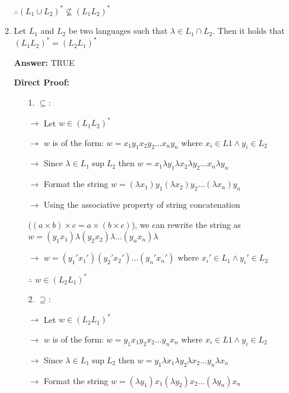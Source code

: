 \documentclass[12pt]{article}
\begin{document}
\begin{spacing}{1.5}
\begin{enumerate}
\begin{enumerate}
			            $\therefore (L_1 \cup L_2)^* \not\subseteq (L_1L_2)^*$

			            \newpage

			      \item Let $L_1$ and $L_2$ be two languages such that $\lambda \in L_1 \cap L_2$. Then it holds that $(L_1L_2)^* = (L_2L_1)^*$

			            \noindent \textbf{Answer:} TRUE

			            \noindent \textbf{Direct Proof:}

			            \begin{enumerate}
				            \item[1.] $\subseteq$:

				                  $\rightarrow$ Let $w \in (L_1L_2)^*$

				                  $\rightarrow$ $w$ is of the form: $w = x_1y_1x_2y_2 \dots x_ny_n$ where $x_i \in L1 \land y_i \in L_2$

				                  $\rightarrow$ Since $\lambda \in L_1 \sup L_2$ then $w = x_1 \lambda y_1 \lambda x_2 \lambda y_2 \dots x_n \lambda y_n$

				                  $\rightarrow$ Format the string $w = (\lambda x_1)y_1(\lambda x_2)y_2 \dots (\lambda x_n)y_n$

				                  $\rightarrow$ Using the associative property of string
				                  concatenation

				                  ($(a\times b) \times c = a \times (b \times c)$), we can rewrite the string as $w = (y_1x_1)\lambda(y_2x_2)\lambda \dots (y_nx_n)\lambda$

				                  $\rightarrow$ $w = (y_1'x_1')(y_2'x_2') \dots (y_n'x_n')$ where $x_i' \in L_1 \land y_i' \in L_2$

				                  $\therefore$ $w \in (L_2L_1)^*$

				            \item[2.] $\supseteq$:

				                  $\rightarrow$ Let $w \in (L_2L_1)^*$

				                  $\rightarrow$ $w$ is of the form: $w = y_1x_1y_2x_2 \dots y_nx_n$ where $x_i \in L1 \land y_i \in L_2$

				                  $\rightarrow$ Since $\lambda \in L_1 \sup L_2$ then $w = y_1 \lambda x_1 \lambda y_2 \lambda x_2 \dots y_n \lambda x_n$

				                  $\rightarrow$ Format the string $w = (\lambda y_1)x_1(\lambda y_2)x_2 \dots (\lambda y_n)x_n$


\end{enumerate}
\end{enumerate}
\end{enumerate}
\end{spacing}
\end{document}
